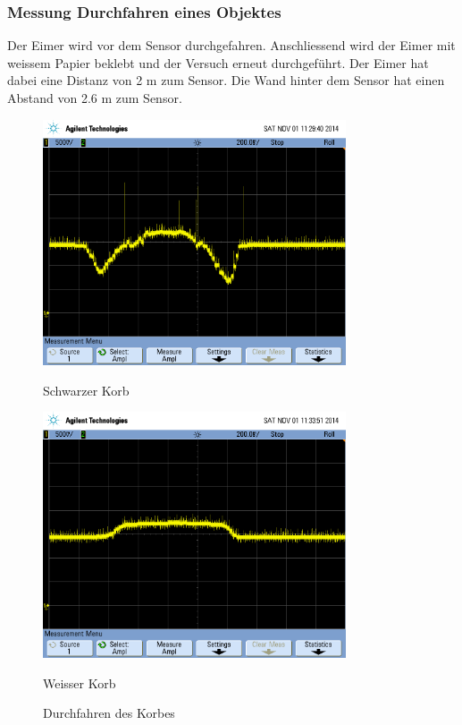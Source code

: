 \subsubsection{Messung Durchfahren eines Objektes}
Der Eimer wird vor dem Sensor durchgefahren. Anschliessend wird der Eimer mit 
weissem Papier beklebt und der Versuch erneut durchgeführt. Der Eimer hat 
dabei eine Distanz von 2 m zum Sensor.  Die Wand hinter dem Sensor hat einen 
Abstand von 2.6 m zum Sensor. 
\begin{figure}[h!]
    \begin{minipage}{0.5\textwidth}
        \centering
        \includegraphics[width=0.8\textwidth]{fig/scope_75.png}
        \caption*{Schwarzer Korb}
        \label{fig:shift_ir_black}
    \end{minipage}
    \begin{minipage}{0.5\textwidth}
        \centering
        \includegraphics[width=0.8\textwidth]{fig/scope_77.png}
        \caption*{Weisser Korb}
        \label{fig:shift_ir_white}
    \end{minipage}
    \caption{Durchfahren des Korbes}
    \label{fig:shift_ir}
\end{figure}

